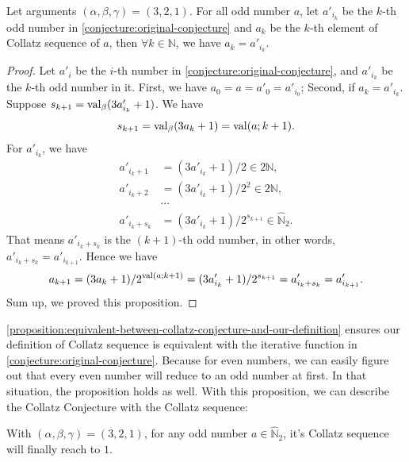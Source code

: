 \begin{proposition}\label{proposition:equivalent-between-collatz-conjecture-and-our-definition}
Let arguments $(\alpha, \beta, \gamma) = (3, 2, 1)$.
For all odd number $a$, let $a'_{i_k}$ be the $k$-th odd number in \cref{conjecture:original-conjecture} and $a_k$ be the $k$-th element of Collatz sequence of $a$, then $\forall k \in \mathbb{N}$,  we have $a_{k} = a'_{i_{k}}$.
\end{proposition}
\begin{proof}
    Let $a'_{i}$ be the $i$-th number in \cref{conjecture:original-conjecture}, and $a'_{i_k}$ be the $k$-th odd number in it.\newline
    First, we have $a_{0} = a = a'_0 = a'_{i_0}$;\newline
    Second, if $a_{k} = a'_{i_k}$. Suppose $s_{k+1} = \operatorname{val}_{\beta}(3a'_{i_k} + 1)$. We have
    \[ s_{k+1} = \operatorname{val}_{\beta}(3a_k + 1) = \operatorname{val}(a;k+1). \]
    For $a'_{i_k}$, we have
    \begin{align*}
        a'_{i_k+1} &= (3a'_{i_k} + 1) / 2 \in 2\mathbb{N},   \\
        a'_{i_k+2} &= (3a'_{i_k} + 1) / 2^2 \in 2\mathbb{N}, \\
        &\cdots \\
        a'_{i_k+s_k} &= (3a'_{i_k} + 1) / 2^{s_{k+1}}  \in \widehat{\mathbb{N}}_{2}.
    \end{align*}
    That means $a'_{i_k+s_k}$ is the $(k+1)$-th odd number,  in other words, $a'_{i_k+s_k} = a'_{i_{k+1}}$.
    Hence we have
    \[ a_{k+1} = (3a_k + 1) / 2^{\operatorname{val}(a;k+1)} = (3a'_{i_k} + 1) / 2^{s_{k+1}} = a'_{i_k+s_k} = a'_{i_{k+1}}. \]
    Sum up, we proved this proposition.
\end{proof}
\cref{proposition:equivalent-between-collatz-conjecture-and-our-definition} ensures our definition of Collatz sequence is equivalent with the iterative function in \cref{conjecture:original-conjecture}.
Because for even numbers, we can easily figure out that every even number will reduce to an odd number at first.
In that situation, the proposition holds as well.
With this proposition, we can describe the Collatz Conjecture with the Collatz sequence:

\begin{conjecture}\label{definition:rewritten-conjecture}
With $(\alpha, \beta, \gamma) = (3, 2, 1)$,
for any odd number $a \in \widehat{\mathbb{N}}_{2}$, it's Collatz sequence will finally reach to $1$.
\end{conjecture}

